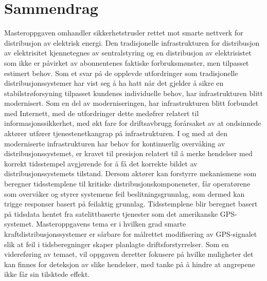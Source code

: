 \chapter*{Sammendrag}

Masteroppgaven omhandler sikkerhetstrusler rettet mot smarte nettverk for distribusjon av elektrisk energi. Den tradisjonelle infrastrukturen for distribusjon av elektrisitet  kjennetegnes av sentralstyring og en distribusjon av elektrisistet som ikke er påvirket av abonnentenes faktiske forbruksmønster, men tilpasset estimert behov. Som et svar på de opplevde utfordringer som tradisjonelle distribusjonssystemer har vist seg å ha hatt når det gjelder å sikre en stabilstrøforsyning tilpasset kundenes individuelle behov, har infrastrukturen blitt modernisert. Som en del av moderniseringen, har  infrastrukturen blitt forbundet med Internett, med de utfordringer dette medøfrer relatert til informasjonssikkerhet, med økt fare for driftsavbrugg forårsaket av at ondsinnede aktører utfører tjenestenetkangrap på infrastrukturen. I og med at den moderniserte infrastrukturen har behov for kontinuerlig overvåking av distribusjonssystemet, er kravet til presisjon relatert til å merke hendelser med korrekt tidsstempel avgjørende for å få det korrekte bildet av distribusjonssystemets tilstand. Dersom aktører kan forstyrre mekanismene som beregner tidsstemplene til kritiske distribusjonskomponeneter, får operatørene som overvåker og styrer systemene feil beslitningsgrunnlag, som dermed kan trigge responser basert på feilaktig grunnlag. Tidsstemplene blir beregnet basert på tidsdata hentet fra satelittbaserte tjenester som det amerikanske GPS-systemet. Masteroppgavens tema er i hvilken grad smarte kraftdistribusjonssystemer er sårbare for målrettet modifisering av GPS-signalet slik at feil i tidsberegninger skaper planlagte driftsforstyrrelser.
Som en videreføring av temaet, vil oppgaven deretter fokusere på hvilke muligheter det kan finnes for deteksjon av slike hendelser, med tanke på å hindre at angrepene ikke får sin tilsktede effekt.